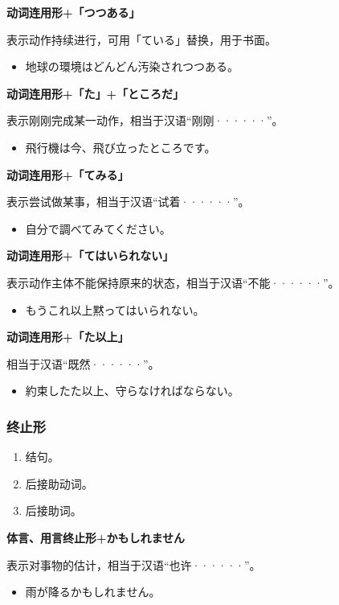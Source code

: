 {\bf
\noindent 动词连用形+「つつある」
}

表示动作持续进行，可用「ている」替换，用于书面。
\begin{itemize}
  \item 地球の環境はどんどん汚染されつつある。
\end{itemize}

{\bf
\noindent 动词连用形+「た」+「ところだ」
}

表示刚刚完成某一动作，相当于汉语``刚刚······''。
\begin{itemize}
  \item 飛行機は今、飛び立ったところです。
\end{itemize}

{\bf
\noindent 动词连用形+「てみる」
}

表示尝试做某事，相当于汉语``试着······''。
\begin{itemize}
  \item 自分で調べてみてください。
\end{itemize}

{\bf
\noindent 动词连用形+「てはいられない」
}

表示动作主体不能保持原来的状态，相当于汉语``不能······''。
\begin{itemize}
  \item もうこれ以上黙ってはいられない。
\end{itemize}

{\bf
\noindent 动词连用形+「た以上」
}

相当于汉语``既然······''。
\begin{itemize}
  \item 約束したた以上、守らなければならない。
\end{itemize}


\subsubsection{终止形}%

\begin{enumerate}
  \item 结句。
  \item 后接助动词。
  \item 后接助词。
\end{enumerate}

{\bf
\noindent 体言、用言终止形+かもしれません
}

表示对事物的估计，相当于汉语``也许······''。
\begin{itemize}
  \item 雨が降るかもしれません。
\end{itemize}

